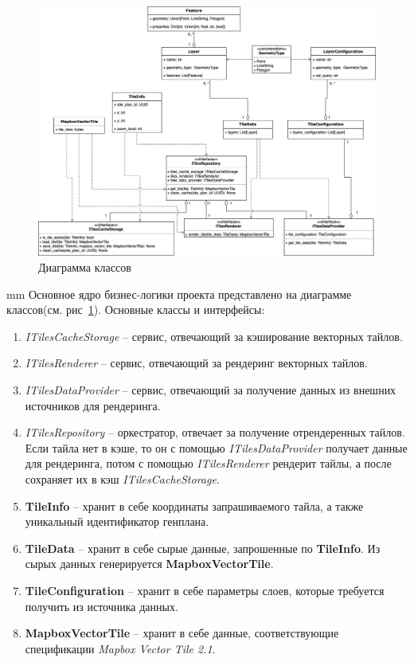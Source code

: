 \begin{figure}[H]
	\hspace*{-2.5 cm}\includegraphics[width=1.2\textwidth]{images/architecture/2}
	\caption{Диаграмма классов}
	\label{pic:architecture__classes-diagram}
\end{figure}
 mm
Основное ядро бизнес-логики проекта представлено на диаграмме классов(см. рис\ \ref{pic:architecture__classes-diagram}).
Основные классы и интерфейсы:
\begin{enumerate}
	\item \textit{ITilesCacheStorage} -- сервис, отвечающий за кэширование векторных тайлов.
	\item \textit{ITilesRenderer} -- сервис, отвечающий за рендеринг векторных тайлов.
	\item \textit{ITilesDataProvider} -- сервис, отвечающий за получение данных из внешних источников для рендеринга.
	\item \textit{ITilesRepository} -- оркестратор, отвечает за получение отрендеренных тайлов.
	Если тайла нет в кэше, то он с помощью \textit{ITilesDataProvider} получает данные для рендеринга, потом
	с помощью \textit{ITilesRenderer} рендерит тайлы, а после сохраняет их в кэш \textit{ITilesCacheStorage}.
	\item \textbf{TileInfo} -- хранит в себе координаты запрашиваемого тайла, а также уникальный идентификатор генплана.
	\item \textbf{TileData} -- хранит в себе сырые данные, запрошенные по \textbf{TileInfo}.
	Из сырых данных генерируется \textbf{MapboxVectorTile}.
	\item \textbf{TileConfiguration} -- хранит в себе параметры слоев, которые требуется получить из источника данных.
	\item \textbf{MapboxVectorTile} -- хранит в себе данные, соответствующие спецификации \textit{Mapbox Vector Tile 2.1}.
\end{enumerate}
